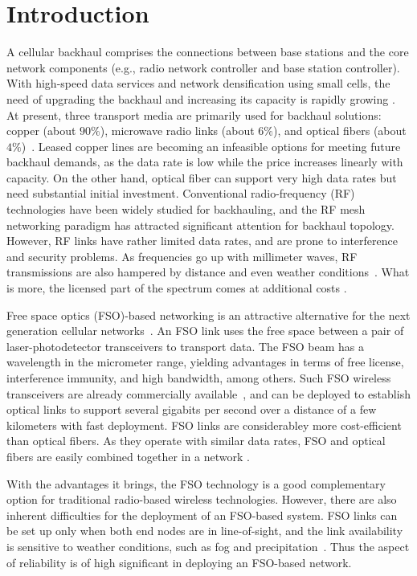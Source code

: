 \documentclass[onecolumn,11pt,draftclsnofoot]{IEEEtran}
\begin{document}
\IEEEpeerreviewmaketitle

\section{Introduction}

A cellular backhaul comprises the connections between base stations and the core network components (e.g., radio network controller and base station controller). With high-speed data services and network densification using small cells, the need of upgrading the backhaul and increasing its capacity is rapidly growing \cite{Ford2013}.
At present, three transport media are primarily used for backhaul solutions: copper (about $90\%$), microwave radio links (about $6\%$), and optical fibers (about $4\%$)~\cite{Tipmongkolsilp2011}. Leased copper lines are becoming an infeasible options for meeting future backhaul demands, as the data rate is low while the price increases linearly with capacity. On the other hand, optical fiber can support very high data rates but need substantial initial investment. Conventional radio-frequency (RF) technologies have been widely studied for backhauling, and the RF mesh networking paradigm has attracted significant attention for backhaul topology. However, RF links have rather limited data rates, and are prone to interference and security problems. As frequencies go up with millimeter waves, RF transmissions are also hampered by distance and even weather conditions~\cite{Frey99}. What is more, the licensed part of the spectrum comes at additional costs \cite{Chia2009}.

Free space optics (FSO)-based networking is an attractive alternative for the next generation cellular networks~\cite{Demers2011}. An FSO link uses the free space between a pair of laser-photodetector transceivers to transport data. The FSO beam has a wavelength in the micrometer range, yielding advantages in terms of free license, interference immunity, and high bandwidth, among others. Such FSO wireless transceivers are already commercially available~\cite{Chan06}, and can be deployed to establish optical links to support several gigabits per second over a distance of a few kilometers with fast deployment. FSO links are considerabley more cost-efficient than optical fibers. As they operate with similar data rates, FSO and optical fibers are easily combined together in a network \cite{Refai2006}.

With the advantages it brings, the FSO technology is a good complementary option for traditional radio-based wireless technologies. However, there are also inherent difficulties for the deployment of an FSO-based system. FSO links can be set up only when both end nodes are in line-of-sight, and the link availability is sensitive to weather conditions, such as fog and precipitation~\cite{Ghassemlooy2012}. Thus the aspect of reliability is of high significant in deploying an FSO-based network.
\end{document}
